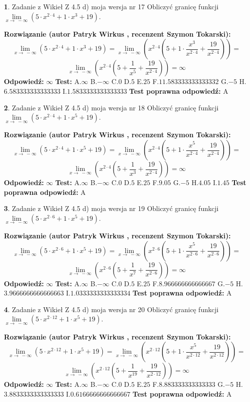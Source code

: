 \documentclass[12pt, a4paper]{article}
\theoremstyle{definition} %
\newtheorem{zad}{}
\newcommand{\zadStart}[1]{\begin{zad}#1\newline}
\newcommand{\zadStop}{\end{zad}}
\newcommand{\rozwStart}[2]{\noindent \textbf{Rozwiązanie (autor #1 , recenzent #2): }\newline}
\newcommand{\rozwStop}{\newline}
\newcommand{\odpStart}{\noindent \textbf{Odpowiedź:}\newline}
\newcommand{\odpStop}{\newline}
\newcommand{\testStart}{\noindent \textbf{Test:}\newline}
\newcommand{\testStop}{\newline}
\newcommand{\kluczStart}{\noindent \textbf{Test poprawna odpowiedź:}\newline}
\newcommand{\kluczStop}{\newline}
\begin{document}
\zadStart{Zadanie z Wikieł Z 4.5 d) moja wersja nr 17}
Obliczyć granicę funkcji  $\lim\limits_{x\to\ -\infty}(5 \cdot x^{2\cdot4}+1 \cdot x^{3}+19)$.
\zadStop
\rozwStart{Patryk Wirkus}{Szymon Tokarski}
$$\lim\limits_{x\to\ -\infty}(5 \cdot x^{2\cdot4}+1 \cdot x^{3}+19) = \lim\limits_{x\to\ -\infty}(x^{2\cdot4}(5 +1 \cdot \frac{x^{3}}{x^{2\cdot4}}+\frac{19}{x^{2\cdot4}})) =$$ $$\lim\limits_{x\to\ -\infty}(x^{2\cdot4}(5 +\frac{1}{x^{5}}+\frac{19}{x^{2\cdot4}})) =\infty$$
\rozwStop
\odpStart
$\infty$
\odpStop
\testStart
A.$\infty$ B.$-\infty$ C.$0$ D.$5$ E.$25$
F.$11.583333333333332$ G.$-5$
H.$6.583333333333333$
I.$1.5833333333333333$
\testStop
\kluczStart
A
\kluczStop



\zadStart{Zadanie z Wikieł Z 4.5 d) moja wersja nr 18}
Obliczyć granicę funkcji  $\lim\limits_{x\to\ -\infty}(5 \cdot x^{2\cdot4}+1 \cdot x^{5}+19)$.
\zadStop
\rozwStart{Patryk Wirkus}{Szymon Tokarski}
$$\lim\limits_{x\to\ -\infty}(5 \cdot x^{2\cdot4}+1 \cdot x^{5}+19) = \lim\limits_{x\to\ -\infty}(x^{2\cdot4}(5 +1 \cdot \frac{x^{5}}{x^{2\cdot4}}+\frac{19}{x^{2\cdot4}})) =$$ $$\lim\limits_{x\to\ -\infty}(x^{2\cdot4}(5 +\frac{1}{x^{3}}+\frac{19}{x^{2\cdot4}})) =\infty$$
\rozwStop
\odpStart
$\infty$
\odpStop
\testStart
A.$\infty$ B.$-\infty$ C.$0$ D.$5$ E.$25$
F.$9.05$ G.$-5$
H.$4.05$
I.$1.45$
\testStop
\kluczStart
A
\kluczStop



\zadStart{Zadanie z Wikieł Z 4.5 d) moja wersja nr 19}
Obliczyć granicę funkcji  $\lim\limits_{x\to\ -\infty}(5 \cdot x^{2\cdot6}+1 \cdot x^{5}+19)$.
\zadStop
\rozwStart{Patryk Wirkus}{Szymon Tokarski}
$$\lim\limits_{x\to\ -\infty}(5 \cdot x^{2\cdot6}+1 \cdot x^{5}+19) = \lim\limits_{x\to\ -\infty}(x^{2\cdot6}(5 +1 \cdot \frac{x^{5}}{x^{2\cdot6}}+\frac{19}{x^{2\cdot6}})) =$$ $$\lim\limits_{x\to\ -\infty}(x^{2\cdot6}(5 +\frac{1}{x^{7}}+\frac{19}{x^{2\cdot6}})) =\infty$$
\rozwStop
\odpStart
$\infty$
\odpStop
\testStart
A.$\infty$ B.$-\infty$ C.$0$ D.$5$ E.$25$
F.$8.966666666666667$ G.$-5$
H.$3.9666666666666663$
I.$1.0333333333333334$
\testStop
\kluczStart
A
\kluczStop



\zadStart{Zadanie z Wikieł Z 4.5 d) moja wersja nr 20}
Obliczyć granicę funkcji  $\lim\limits_{x\to\ -\infty}(5 \cdot x^{2\cdot12}+1 \cdot x^{5}+19)$.
\zadStop
\rozwStart{Patryk Wirkus}{Szymon Tokarski}
$$\lim\limits_{x\to\ -\infty}(5 \cdot x^{2\cdot12}+1 \cdot x^{5}+19) = \lim\limits_{x\to\ -\infty}(x^{2\cdot12}(5 +1 \cdot \frac{x^{5}}{x^{2\cdot12}}+\frac{19}{x^{2\cdot12}})) =$$ $$\lim\limits_{x\to\ -\infty}(x^{2\cdot12}(5 +\frac{1}{x^{19}}+\frac{19}{x^{2\cdot12}})) =\infty$$
\rozwStop
\odpStart
$\infty$
\odpStop
\testStart
A.$\infty$ B.$-\infty$ C.$0$ D.$5$ E.$25$
F.$8.883333333333333$ G.$-5$
H.$3.8833333333333333$
I.$0.6166666666666667$
\testStop
\kluczStart
A
\kluczStop
\end{document}
